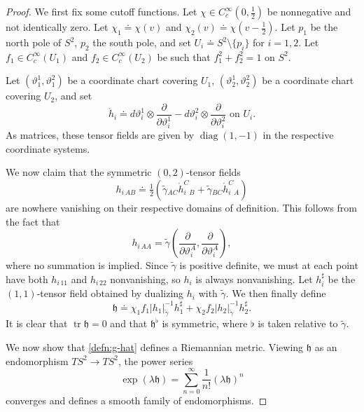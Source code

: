 \documentclass[10pt]{article}
\numberwithin{equation}{section}
\theoremstyle{plain}
\theoremstyle{definition}
\newcommand{\diag}{\operatorname{diag}}
\newcommand{\tr}{\operatorname{tr}}
\begin{document}
\begin{proof}
    
We first fix some cutoff functions. Let $\chi\in C^\infty_c(0,\tfrac 12)$ be nonnegative and not identically zero. Let $\chi_1\doteq \chi(v)$ and $\chi_2(v) \doteq\chi(v-\tfrac 12)$. Let $p_1$ be the north pole of $S^2$, $p_2$ the south pole, and set $U_i\doteq S^2\setminus\{p_i\}$ for $i=1,2$. Let $f_1\in C^\infty_c(U_1)$ and $f_2\in C^\infty_c(U_2)$ be such that $f_1^2+f_2^2= 1$ on $S^2$. 

Let $(\vartheta_1^1,\vartheta_1^2)$ be a coordinate chart covering $U_1$, $(\vartheta_2^1,\vartheta_2^2)$ be a coordinate chart covering $U_2$, and set
\[\mathring h_i \doteq d\vartheta_i^1\otimes \frac{\partial}{\partial\vartheta_i^1}-d\vartheta_i^2\otimes \frac{\partial}{\partial\vartheta_i^2}\text{ on }U_i.\] As matrices, these tensor fields are given by $\diag(1,-1)$ in the respective coordinate systems. 

We now claim that the symmetric $(0,2)$-tensor fields 
\[ h_{i\,AB}\doteq \tfrac 12\left(\tilde\gamma{}_{AC}\mathring h_i^C{}_B+\tilde\gamma{}_{BC}\mathring h_i^C{}_A\right)\]
are nowhere vanishing on their respective domains of definition. 
This follows from the fact that 
\begin{equation*}
     h_{i\,AA} = \tilde\gamma\left(\frac{\partial}{\partial\vartheta_i^A},\frac{\partial}{\partial\vartheta_i^A}\right),
\end{equation*}
where no summation is implied. Since $\tilde\gamma$ is positive definite, we must at each point have both $ h_{i\,11}$ and $ h_{i\,22}$ nonvanishing, so $ h_i$ is always nonvanishing. Let $ h^\sharp_{i}$ be the $(1,1)$-tensor field obtained by dualizing $ h_i$ with $\tilde\gamma$. We then finally define
\begin{equation}
    \mathfrak h\doteq \chi_1 f_1| h_1|_{\tilde\gamma}^{-1}  h_1^\sharp + \chi_2 f_2| h_2|_{\tilde\gamma}^{-1} h_2^\sharp.\label{eq:h-defn}
\end{equation}
It is clear that $\tr\mathfrak h =0$ and that $\mathfrak h^\flat$ is symmetric, where $\flat$ is taken relative to $\tilde\gamma$. 

We now show that \eqref{defn:g-hat} defines a Riemannian metric. Viewing $\mathfrak h$ as an endomorphism $TS^2\to TS^2$, the power series 
\begin{equation}
    \exp(\lambda\mathfrak h) = \sum_{n=0}^\infty \frac{1}{n!}(\lambda \mathfrak h)^n\label{eq:power-series}
\end{equation}
converges and defines a smooth family of endomorphisms. 


\end{proof}
\end{document}
